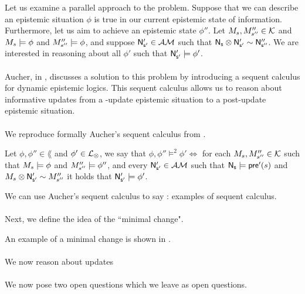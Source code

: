 Let us examine a parallel approach to the problem.
Suppose that we can describe an epistemic situation $\phi$ is true in our current epistemic state of
information.
Furthermore, let us aim to achieve an epistemic state $\phi''$.
Let $M_s, M''_{s''} \in \mathcal{K}$ and $M_s \models \phi$ and $M''_{s''}
\models \phi$, and suppose $\mathrm{\mathsf{N}}'_{\mathrm{\mathsf{s}}'} \in \mathcal{AM}$ such that $\mathrm{\mathsf{N}}_\mathrm{\mathsf{s}} \otimes
\mathrm{\mathsf{N}}'_{\mathrm{\mathsf{s}}'} \sim \mathrm{\mathsf{N}}''_{\mathrm{\mathsf{s}}''}$.
We are interested in reasoning about all $\phi'$ such that $\mathrm{\mathsf{N}}'_{\mathrm{\mathsf{s}}'}
\models \phi'$.\\
\\
Aucher, in \cite{doi:10.3166/jancl.21.289-321,doi:10.1080/11663081.2012.736703},
discusses a solution to this problem by introducing a sequent calculus for dynamic 
epistemic logics.
This sequent calculus allows us to reason about informative updates from
a \evpr-update epistemic situation to a post-update epistemic situation.\\
\\
We reproduce formally Aucher's sequent calculus from
\cite{doi:10.1080/11663081.2012.736703}.

\begin{defn}
Let $\phi, \phi'' \in \lang$ and $\phi' \in \mathcal{L}_{\otimes}$, we say that
$\phi, \phi'' \models^2 \phi' \iff$ for each $M_s, M''_{s''} \in \mathcal{K}$
such that $M_s \models \phi$ and $M''_{s''} \models \phi''$, and every $\mathrm{\mathsf{N}}'_{\mathrm{\mathsf{s}}'}
\in \mathcal{AM}$ such that $\mathrm{\mathsf{N}}_\mathrm{\mathsf{s}} \models \mathrm{\mathsf{pre}}'(s)$ and $M_s \otimes \mathrm{\mathsf{N}}'_{\mathrm{\mathsf{s}}'}
\sim M''_{s''}$ it holds that $\mathrm{\mathsf{N}}'_{\mathrm{\mathsf{s}}'} \models \phi'$.
\end{defn}

We can use Aucher's sequent calculus to say \FIXME: examples of sequent calculus.\\
\\
Next, we define the idea of the ``minimal change".

\begin{defn}
	\FIXME
\end{defn}

An example of a minimal change is shown in \FIXME.\\
\\
We now reason about updates \FIXME \\
\\
We now pose two open questions which we leave as open questions.
\FIXME
